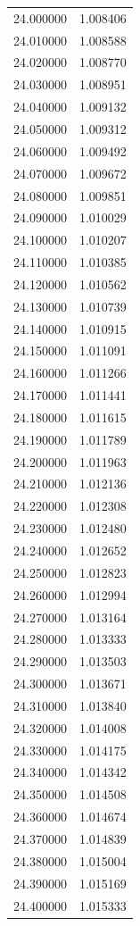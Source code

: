 \begin{tabular}{rr}
24.000000 & 1.008406 \\
24.010000 & 1.008588 \\
24.020000 & 1.008770 \\
24.030000 & 1.008951 \\
24.040000 & 1.009132 \\
24.050000 & 1.009312 \\
24.060000 & 1.009492 \\
24.070000 & 1.009672 \\
24.080000 & 1.009851 \\
24.090000 & 1.010029 \\
24.100000 & 1.010207 \\
24.110000 & 1.010385 \\
24.120000 & 1.010562 \\
24.130000 & 1.010739 \\
24.140000 & 1.010915 \\
24.150000 & 1.011091 \\
24.160000 & 1.011266 \\
24.170000 & 1.011441 \\
24.180000 & 1.011615 \\
24.190000 & 1.011789 \\
24.200000 & 1.011963 \\
24.210000 & 1.012136 \\
24.220000 & 1.012308 \\
24.230000 & 1.012480 \\
24.240000 & 1.012652 \\
24.250000 & 1.012823 \\
24.260000 & 1.012994 \\
24.270000 & 1.013164 \\
24.280000 & 1.013333 \\
24.290000 & 1.013503 \\
24.300000 & 1.013671 \\
24.310000 & 1.013840 \\
24.320000 & 1.014008 \\
24.330000 & 1.014175 \\
24.340000 & 1.014342 \\
24.350000 & 1.014508 \\
24.360000 & 1.014674 \\
24.370000 & 1.014839 \\
24.380000 & 1.015004 \\
24.390000 & 1.015169 \\
24.400000 & 1.015333 \\

\end{tabular}

